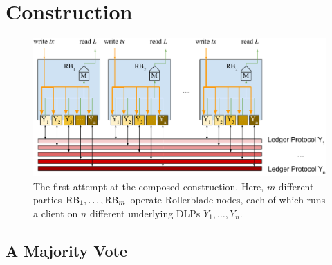 \section{Construction}\label{sec:construction}

\begin{figure}
    \centering
    \includegraphics[width=\textwidth,keepaspectratio]{figures/rollerblade-naive-construction.pdf}
    \caption{The first attempt at the composed construction. Here,
             $m$ different parties $\mathrm{RB}_1, \ldots, \mathrm{RB}_m$ operate Rollerblade
             nodes, each of which runs a client on $n$ different underlying
             DLPs $Y_1, \ldots, Y_n$.}
    \label{fig.naive}
\end{figure}

\subsection{A Majority Vote}\label{sec:construction-naive}

